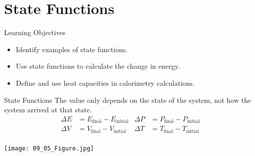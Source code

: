 \documentclass[notes=only]{beamer}
\begin{document}
\section{State Functions}

\begin{frame}{Learning Objectives}
	\begin{itemize}
	\item Identify examples of state functions.
	\item Use state functions to calculate the change in energy.
	\item Define and use heat capacities in calorimetry calculations.
	\end{itemize}
\end{frame}

\begin{frame}{State Functions}
	The value only depends on the state of the system, not how the
	system arrived at that state.
	\begin{align*}
		\Delta E &= E_\text{final} - E_\text{initial} &
		\Delta P &= P_\text{final} - P_\text{initial} \\
		\Delta V &= V_\text{final} - V_\text{initial} &
		\Delta T &= T_\text{final} - T_\text{initial} \\
	\end{align*}
	\begin{center}
		\texttt{[image: 09\_05\_Figure.jpg]}
	\end{center}
\end{frame}

%
\end{document}
